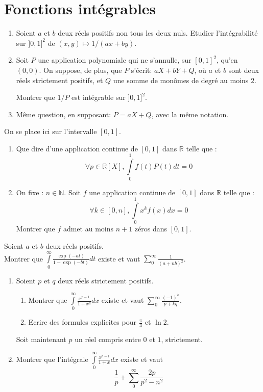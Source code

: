 \section{Fonctions int\'egrables}

\begin{exer}
\begin{enumerate}
\item Soient $a$ et $b$ deux réels positifs non tous les deux nuls. %
Etudier l'intégrabilité sur $]0,1]^{2}$ de $(x,y) \mapsto 1/(ax + by)$.
\item Soit $P$ une application polynomiale qui ne s'annulle, sur $[0,1]^{2}$, qu'en $(0,0)$. %
On suppose, de plus, que $P$ s'écrit: $aX + bY + Q$, où $a$ et $b$ sont deux réels strictement positifs, %
et $Q$ une somme de monômes de degré au moins $2$.

Montrer que $1/P$ est intégrable sur $]0,1]^{2}$.
\item Même question, en supposant: $P = aX + Q$, avec la même notation.
\end{enumerate}
\end{exer}

\begin{exer}
On se place ici sur l'intervalle $[0,1]$.
\begin{enumerate}
\item Que dire d'une application continue de $[0,1]$ dans $\mathbb{R}$ telle que :
\[\forall p \in \mathbb{R}[X] , \int\limits_0^1 f(t)P(t) dt = 0\]
\item On fixe : $n \in \mathbb{N}$. %
Soit $f$ une application continue de $[0,1]$ dans $\mathbb{R}$ telle que :
\[\forall k \in [0,n] , \int\limits_0^1 x^k f(x) dx = 0\]
Montrer que $f$ admet au moins $n+1$ z\'eros dans $[0,1]$.
\end{enumerate}
\end{exer}

\begin{exer}
Soient $a$ et $b$ deux réels positifs.\\
Montrer que $\int\limits_0^{\infty} \frac{\exp(-at)}{1 - \exp(-bt)} dt$ existe %
et vaut $\sum\limits_0^{\infty} \frac{1}{(a + nb)^2}$.
\end{exer}

\begin{exer}
\begin{enumerate}
\item Soient $p$ et $q$ deux réels strictement positifs.
\begin{enumerate}
\item Montrer que $\int\limits_0^{\infty} \frac{x^{p-1}}{1+x^q} dx$ existe et vaut $\sum\limits_0^{\infty} \frac{(-1)^k}{p+kq}$.
\item Ecrire des formules explicites pour $\frac{\pi}{4}$ et $\ln 2$.
\end{enumerate}

Soit maintenant $p$ un réel compris entre $0$ et $1$, strictement.
\item Montrer que l'intégrale $\int\limits_0^{\infty} \frac{x^{p-1}}{1+x} dx$ existe et vaut
\[\frac{1}{p} + \sum\limits_0^{\infty} \frac{2p}{p^2 - n^2}\]
\end{enumerate}
\end{exer}

